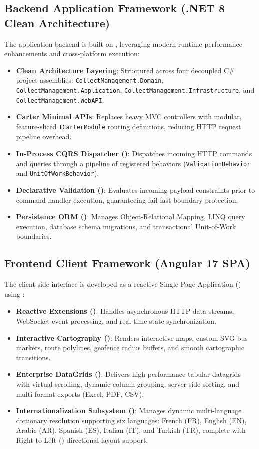 \subsection{Backend Application Framework (.NET 8 Clean Architecture)}
The application backend is built on , leveraging modern runtime performance enhancements and cross-platform execution:
\begin{itemize}
  \item \textbf{Clean Architecture Layering}: Structured across four decoupled C\# project assemblies: \texttt{CollectManagement.Domain}, \texttt{CollectManagement.Application}, \texttt{CollectManagement.Infrastructure}, and \texttt{CollectManagement.WebAPI}.
  \item \textbf{Carter Minimal APIs}: Replaces heavy MVC controllers with modular, feature-sliced \texttt{ICarterModule} routing definitions, reducing HTTP request pipeline overhead.
  \item \textbf{In-Process CQRS Dispatcher ()}: Dispatches incoming HTTP commands and queries through a pipeline of registered behaviors (\texttt{ValidationBehavior} and \texttt{UnitOfWorkBehavior}).
  \item \textbf{Declarative Validation ()}: Evaluates incoming payload constraints prior to command handler execution, guaranteeing fail-fast boundary protection.
  \item \textbf{Persistence ORM ()}: Manages Object-Relational Mapping, LINQ query execution, database schema migrations, and transactional Unit-of-Work boundaries.
\end{itemize}

\subsection{Frontend Client Framework (Angular 17 SPA)}
The client-side interface is developed as a reactive Single Page Application () using :
\begin{itemize}
  \item \textbf{Reactive Extensions ()}: Handles asynchronous HTTP data streams, WebSocket event processing, and real-time state synchronization.
  \item \textbf{Interactive Cartography ()}: Renders interactive maps, custom SVG bus markers, route polylines, geofence radius buffers, and smooth cartographic transitions.
  \item \textbf{Enterprise DataGrids ()}: Delivers high-performance tabular datagrids with virtual scrolling, dynamic column grouping, server-side sorting, and multi-format exports (Excel, PDF, CSV).
  \item \textbf{Internationalization Subsystem ()}: Manages dynamic multi-language dictionary resolution supporting six languages: French (FR), English (EN), Arabic (AR), Spanish (ES), Italian (IT), and Turkish (TR), complete with Right-to-Left () directional layout support.
\end{itemize}

